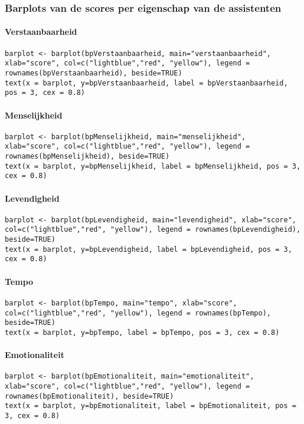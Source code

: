 \subsubsection{Barplots van de scores per eigenschap van de assistenten}
\paragraph{Verstaanbaarheid}
\begin{lstlisting}
barplot <- barplot(bpVerstaanbaarheid, main="verstaanbaarheid", xlab="score", col=c("lightblue","red", "yellow"), legend = rownames(bpVerstaanbaarheid), beside=TRUE)
text(x = barplot, y=bpVerstaanbaarheid, label = bpVerstaanbaarheid, pos = 3, cex = 0.8)
\end{lstlisting}

\paragraph{Menselijkheid}
\begin{lstlisting}
barplot <- barplot(bpMenselijkheid, main="menselijkheid", xlab="score", col=c("lightblue","red", "yellow"), legend = rownames(bpMenselijkheid), beside=TRUE)
text(x = barplot, y=bpMenselijkheid, label = bpMenselijkheid, pos = 3, cex = 0.8)
\end{lstlisting}

\paragraph{Levendigheid}
\begin{lstlisting}
barplot <- barplot(bpLevendigheid, main="levendigheid", xlab="score", col=c("lightblue","red", "yellow"), legend = rownames(bpLevendigheid), beside=TRUE)
text(x = barplot, y=bpLevendigheid, label = bpLevendigheid, pos = 3, cex = 0.8)
\end{lstlisting}

\paragraph{Tempo}
\begin{lstlisting}
barplot <- barplot(bpTempo, main="tempo", xlab="score", col=c("lightblue","red", "yellow"), legend = rownames(bpTempo), beside=TRUE)
text(x = barplot, y=bpTempo, label = bpTempo, pos = 3, cex = 0.8)
\end{lstlisting}

\paragraph{Emotionaliteit}
\begin{lstlisting}
barplot <- barplot(bpEmotionaliteit, main="emotionaliteit", xlab="score", col=c("lightblue","red", "yellow"), legend = rownames(bpEmotionaliteit), beside=TRUE)
text(x = barplot, y=bpEmotionaliteit, label = bpEmotionaliteit, pos = 3, cex = 0.8)
\end{lstlisting}

